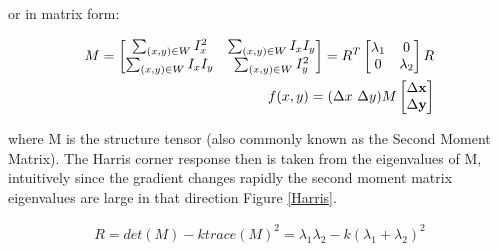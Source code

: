 \documentclass[11pt,twoside]{report}
\begin{document}
or in matrix form:

\begin{equation}
\begin{aligned}
M = 
\begin{bmatrix}
\sum_{(x,y) \in W} I_{x}^{2} & \sum_{(x,y) \in W} I_{x}I_{y} \\
\sum_{(x,y)\in W} I_{x}I_{y}& 
\sum_{(x,y)\in W} I_{y}^{2}
\end{bmatrix} = 
R^{T}
\begin{bmatrix}
\lambda_{1} & 0 \\
0 & \lambda_{2}
\end{bmatrix}
R
\\
f(x,y) = (\Delta x \textnormal{ } \Delta y) M 
\begin{bmatrix}
\Delta \mathbf{x} \\
\Delta \mathbf{y}
\end{bmatrix}
\end{aligned}
\end{equation}

where M is the structure tensor (also commonly known as the Second Moment Matrix). The Harris corner response then is taken from the eigenvalues of M, intuitively since the gradient changes rapidly the second moment matrix eigenvalues are large in that direction Figure \ref{Harris}.


\begin{equation}
\begin{aligned}
R = det(M) - \mathit{k}trace(M)^{2} = \lambda_{1}\lambda_{2} - \mathit{k}(\lambda_{1} + \lambda_{2})^{2}
\end{aligned}
\end{equation}
\end{document}
